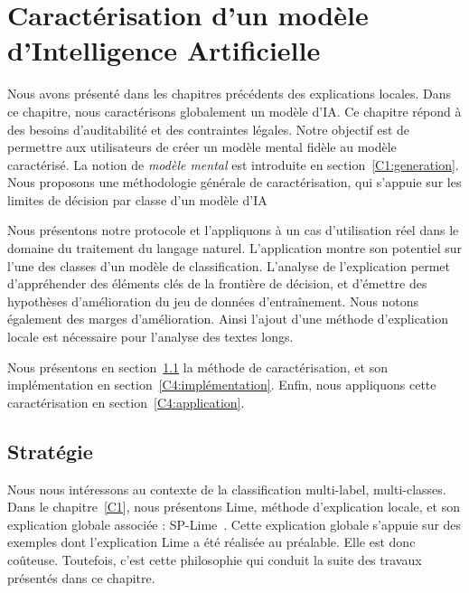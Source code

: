 \chapter[Caractérisation d'un modèle d'Intelligence Artificielle]{Caractérisation d'un modèle d'Intelligence Artificielle}


Nous avons présenté dans les chapitres précédents des explications locales.
Dans ce chapitre, nous caractérisons globalement un modèle d'IA.
Ce chapitre répond à des besoins d'auditabilité et des contraintes légales.
Notre objectif est de permettre aux utilisateurs de créer un modèle mental fidèle au modèle caractérisé. La notion de \textit{modèle mental} est introduite en section~\ref{C1:generation}.
Nous proposons une méthodologie générale de caractérisation, qui s'appuie sur les limites de décision par classe d'un modèle d'IA

Nous présentons notre protocole et l'appliquons à un cas d'utilisation réel dans le domaine du traitement du langage naturel.
L'application montre son potentiel sur l'une des classes d'un modèle de classification. L'analyse de l'explication permet d'appréhender des éléments clés de la frontière de décision, et d'émettre des hypothèses d'amélioration du jeu de données d'entraînement.
Nous notons également des marges d'amélioration. Ainsi l'ajout d'une méthode d'explication locale est nécessaire pour l'analyse des textes longs.

Nous présentons en section~\ref{C4:strategie} la méthode de caractérisation, et son implémentation en section~\ref{C4:implémentation}. Enfin, nous appliquons cette caractérisation en section~\ref{C4:application}.



\section{Stratégie}  \label{C4:strategie}
Nous nous  intéressons au contexte de la classification multi-label, multi-classes.
Dans le chapitre~\ref{C1}, nous présentons Lime, méthode d'explication locale, et son explication globale associée : SP-Lime~\cite{Ribeiro2016}. Cette explication globale s'appuie sur des exemples dont l'explication Lime a été réalisée au préalable. Elle est donc coûteuse. Toutefois, c'est cette philosophie qui conduit la suite des travaux présentés dans ce chapitre.


